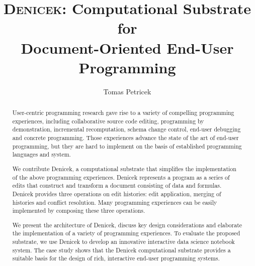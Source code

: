 \documentclass[sigconf,anonymous,screen]{acmart}
\begin{document}
\title[Denicek: Computational Substrate for Document-Oriented End-User
  Programming]{{\scshape Denicek}: Computational Substrate for\\ Document-Oriented End-User Programming}

\author{Tomas Petricek}

\begin{abstract}
User-centric programming research gave rise to a variety of compelling programming experiences,
including collaborative source code editing, programming by demonstration, incremental
recomputation, schema change control, end-user debugging and concrete programming.
Those experiences advance the state of the art of end-user programming, but they are hard to
implement on the basis of established programming languages and system.

We contribute Denicek, a computational substrate that simplifies the implementation of the
above programming experiences. Denicek represents a program as a series of edits
that construct and transform a document consisting of data and formulas. Denicek provides three
operations on edit histories: edit application, merging of histories and conflict resolution.
Many programming experiences can be easily implemented by composing these three operations.

We present the architecture of Denicek, discuss key design considerations and elaborate
the implementation of a variety of programming experiences. To evaluate the proposed
substrate, we use Denicek to develop an innovative interactive data science notebook system.
The case study shows that the Denicek computational substrate provides a suitable basis for
the design of rich, interactive end-user programming systems.
\end{abstract}


\maketitle
\end{document}
